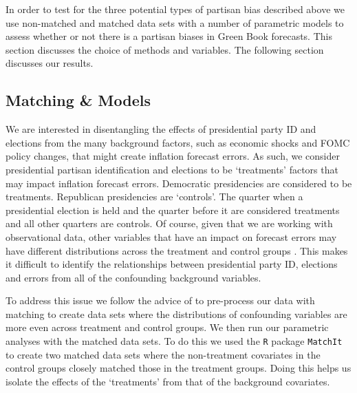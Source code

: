 \documentclass[a4paper]{article}\usepackage{graphicx, color}
\begin{document}
In order to test for the three potential types of partisan bias described above we use non-matched and matched data sets with a number of parametric models \citep[see][]{Ho2007} to assess whether or not there is a partisan biases in Green Book forecasts. This section discusses the choice of methods and variables. The following section discusses our results.

\subsection{Matching \& Models}

We are interested in disentangling the effects of presidential party ID and elections from the many background factors, such as economic shocks and FOMC policy changes, that might create inflation forecast errors. As such, we consider presidential partisan identification and elections to be `treatments' factors that may impact inflation forecast errors. Democratic presidencies are considered to be treatments. Republican presidencies are `controls'. The quarter when a presidential election is held and the quarter before it are considered treatments and all other quarters are controls. Of course, given that we are working with observational data, other variables that have an impact on forecast errors may have different distributions across the treatment and control groups \citep{Cochran1973, Diamond2012}. This makes it difficult to identify the relationships between presidential party ID, elections and errors from all of the confounding background variables.

To address this issue we follow the advice of \cite{Ho2007} to pre-process our data with matching to create data sets where the distributions of confounding variables are more even across treatment and control groups. We then run our parametric analyses with the matched data sets. To do this we used the {\tt{R}} package {\tt{MatchIt}} \citep{matchit2011} to create two matched data sets where the non-treatment covariates in the control groups closely matched those in the treatment groups. Doing this helps us isolate the effects of the `treatments' from that of the background covariates. 
\end{document}
